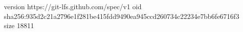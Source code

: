 version https://git-lfs.github.com/spec/v1
oid sha256:935d2c21a2796e1f281be415fdd9490ea945ccd260734c22234e7bb6fe6716f3
size 18811
